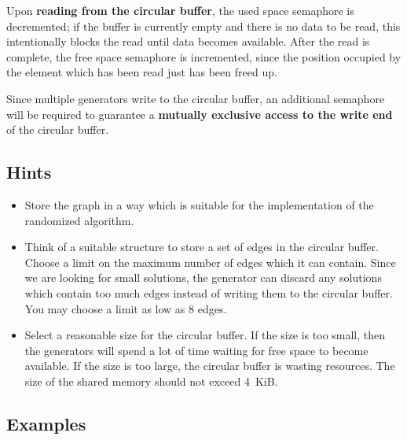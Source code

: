 Upon \textbf{reading from the circular buffer}, the used space semaphore is decremented;
if the buffer is currently empty and there is no data to be read,
this intentionally blocks the read until data becomes available.
After the read is complete, the free space semaphore is incremented,
since the position occupied by the element which has been read just has been freed up.

Since multiple generators write to the circular buffer,
an additional semaphore will be required
to guarantee a \textbf{mutually exclusive access to the write end} of the circular buffer.

\subsection*{Hints}
\begin{itemize}
\item Store the graph in a way which is suitable for the implementation of the randomized algorithm.

\item Think of a suitable structure to store a set of edges in the circular buffer.
Choose a limit on the maximum number of edges which it can contain.
Since we are looking for small solutions,
the generator can discard any solutions which contain too much edges
instead of writing them to the circular buffer.
You may choose a limit as low as 8 edges.

\item Select a reasonable size for the circular buffer.
If the size is too small,
then the generators will spend a lot of time waiting for free space to become available.
If the size is too large,
the circular buffer is wasting resources.
The size of the shared memory should not exceed 4~KiB.

\end{itemize}

\clearpage
\subsection*{Examples}
\setlength{\columnsep}{-20mm}

